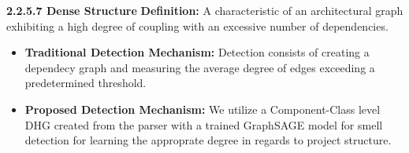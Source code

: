 \vspace{1em}
\textbf{2.2.5.7  Dense Structure}
\textbf{Definition:} A characteristic of an architectural graph exhibiting a high degree of coupling with an excessive number of dependencies.
\begin{itemize}
    \item \textbf{Traditional Detection Mechanism:} Detection consists of creating a dependecy graph and measuring the average degree of edges exceeding a predetermined threshold.
    \item \textbf{Proposed Detection Mechanism:} We utilize a Component-Class level DHG created from the parser with a trained GraphSAGE model for smell detection for learning the approprate degree in regards to project structure.
\end{itemize}
